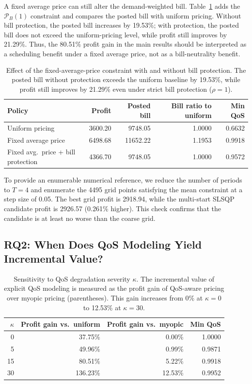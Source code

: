 \documentclass[11pt]{article}
\begin{document}
A fixed average price can still alter the demand-weighted bill.
Table~\ref{tab:bill_protection} adds the $\mathcal{P}_B(1)$ constraint and
compares the posted bill with uniform pricing. Without bill protection, the
posted bill increases by 19.53\%; with protection, the posted bill does not
exceed the uniform-pricing level, while profit still improves by 21.29\%.
Thus, the 80.51\% profit gain in the main results should be interpreted as
a scheduling benefit under a fixed average price, not as a bill-neutrality
benefit.

\begin{table}[htbp]
\centering
\caption{Effect of the fixed-average-price constraint with and without bill
protection. The posted bill without protection exceeds the uniform baseline
by 19.53\%, while profit still improves by 21.29\% even under strict bill
protection ($\rho=1$).}
\label{tab:bill_protection}
\begin{tabular}{lrrrr}
\toprule
Policy & Profit & Posted bill & Bill ratio to uniform & Min QoS \\
\midrule
Uniform pricing & 3600.20 & 9748.05 & 1.0000 & 0.6632 \\
Fixed average price & 6498.68 & 11652.22 & 1.1953 & 0.9918 \\
Fixed avg.\ price + bill protection & 4366.70 & 9748.05 & 1.0000 & 0.9572 \\
\bottomrule
\end{tabular}
\end{table}

To provide an enumerable numerical reference, we reduce the number of
periods to $T=4$ and enumerate the 4495 grid points satisfying the mean
constraint at a step size of 0.05. The best grid profit is 2918.94, while
the multi-start SLSQP candidate profit is 2926.57 (0.261\% higher). This
check confirms that the candidate is at least no worse than the coarse grid.

\subsection{RQ2: When Does QoS Modeling Yield Incremental Value?}

\begin{table}[htbp]
\centering
\caption{Sensitivity to QoS degradation severity $\kappa$. The incremental
value of explicit QoS modeling is measured as the profit gain of QoS-aware
pricing over myopic pricing (parentheses). This gain increases from 0\% at
$\kappa=0$ to 12.53\% at $\kappa=30$.}
\label{tab:kappa}
\begin{tabular}{rrrr}
\toprule
$\kappa$ & Profit gain vs.\ uniform & Profit gain vs.\ myopic & Min QoS \\
\midrule
0  & 37.75\% & 0.00\% & 1.0000 \\
5  & 49.96\% & 0.99\% & 0.9871 \\
15 & 80.51\% & 5.22\% & 0.9918 \\
30 & 136.23\% & 12.53\% & 0.9952 \\
\bottomrule
\end{tabular}
\end{table}
\end{document}
